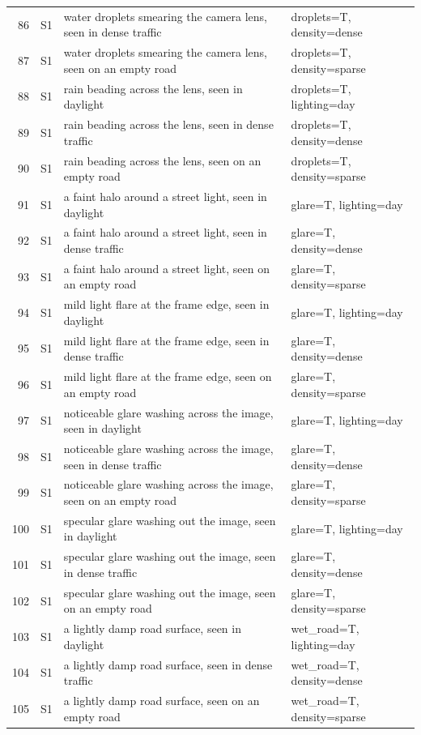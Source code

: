 \begin{longtable}{r l p{8.6cm} p{5.6cm}}
86 & S1 & water droplets smearing the camera lens, seen in dense traffic & droplets=T, density=dense\\
87 & S1 & water droplets smearing the camera lens, seen on an empty road & droplets=T, density=sparse\\
88 & S1 & rain beading across the lens, seen in daylight & droplets=T, lighting=day\\
89 & S1 & rain beading across the lens, seen in dense traffic & droplets=T, density=dense\\
90 & S1 & rain beading across the lens, seen on an empty road & droplets=T, density=sparse\\
91 & S1 & a faint halo around a street light, seen in daylight & glare=T, lighting=day\\
92 & S1 & a faint halo around a street light, seen in dense traffic & glare=T, density=dense\\
93 & S1 & a faint halo around a street light, seen on an empty road & glare=T, density=sparse\\
94 & S1 & mild light flare at the frame edge, seen in daylight & glare=T, lighting=day\\
95 & S1 & mild light flare at the frame edge, seen in dense traffic & glare=T, density=dense\\
96 & S1 & mild light flare at the frame edge, seen on an empty road & glare=T, density=sparse\\
97 & S1 & noticeable glare washing across the image, seen in daylight & glare=T, lighting=day\\
98 & S1 & noticeable glare washing across the image, seen in dense traffic & glare=T, density=dense\\
99 & S1 & noticeable glare washing across the image, seen on an empty road & glare=T, density=sparse\\
100 & S1 & specular glare washing out the image, seen in daylight & glare=T, lighting=day\\
101 & S1 & specular glare washing out the image, seen in dense traffic & glare=T, density=dense\\
102 & S1 & specular glare washing out the image, seen on an empty road & glare=T, density=sparse\\
103 & S1 & a lightly damp road surface, seen in daylight & wet\_road=T, lighting=day\\
104 & S1 & a lightly damp road surface, seen in dense traffic & wet\_road=T, density=dense\\
105 & S1 & a lightly damp road surface, seen on an empty road & wet\_road=T, density=sparse\\

\end{longtable}
